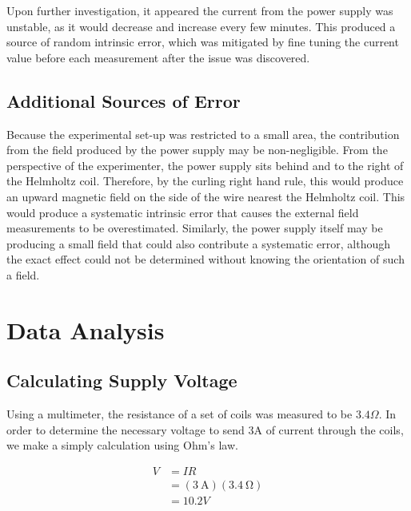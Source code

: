 \documentclass[a4paper]{article}
\begin{document}
\qq Upon further investigation, it appeared the current from the power supply was
unstable, as it would decrease and increase every few minutes. This produced a
source of random intrinsic error, which was mitigated by fine tuning the current
value before each measurement after the issue was discovered.


\subsection{Additional Sources of Error}


\qq Because the experimental set-up was restricted to a small area, the contribution
from the field produced by the power supply may be non-negligible. From the
perspective of the experimenter, the power supply sits behind and to the right
of the Helmholtz coil. Therefore, by the curling right hand rule, this would
produce an upward magnetic field on the side of the wire nearest the Helmholtz
coil. This would produce a systematic intrinsic error that causes the external
field measurements to be overestimated. Similarly, the power supply itself may
be producing a small field that could also contribute a systematic error,
although the exact effect could not be determined without knowing the
orientation of such a field.


\section{Data Analysis}


\subsection{Calculating Supply Voltage}

\qq Using a multimeter, the resistance of a set of coils was measured to be
$3.4 \Omega$. In order to determine the necessary voltage to send 3A of current
through the coils, we make a simply calculation using Ohm's law.


\begin{align*}
V &= IR \\
  &= (\SI{3}{\ampere})(\SI{3.4}{\ohm}) \\
  &= 10.2V \\
\end{align*}
\end{document}
